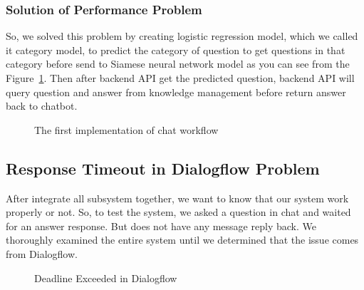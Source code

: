 \documentclass[12pt,oneside,openright,a4paper]{cpe-english-project}
\begin{document}
\subsubsection{Solution of Performance Problem}
So, we solved this problem by creating logistic regression model, which we called it category model,
to predict the category of question to get questions in that category before send to Siamese neural
network model as you can see from the Figure~\ref*{fig:model_pattern1}. Then after backend API get the
predicted question, backend API will query question and answer from knowledge management before
return answer back to chatbot.

\begin{figure}[!h]\centering
{}
\caption{The first implementation of chat workflow}
\label{fig:model_pattern1}
\end{figure}

\subsection{Response Timeout in Dialogflow Problem}
\label{response_timeout_problem_section}
After integrate all subsystem together, we want to know that our system work properly or not.
So, to test the system, we asked a question in chat and waited for an answer response. But does not have
any message reply back. We thoroughly examined the entire system until we determined that the issue
comes from Dialogflow.

\begin{figure}[!h]\centering
{}
\caption{Deadline Exceeded in Dialogflow}
\label{fig:dialogflow_deadline_exceed}
\end{figure}
\end{document}
